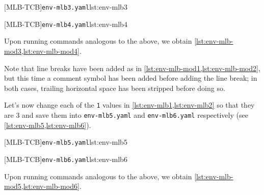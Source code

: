		\begin{minipage}{.45\textwidth}
			{\texttt{env-mlb3.yaml}}{lst:env-mlb3}
		\end{minipage}
		\hfill
		\begin{minipage}{.45\textwidth}
			{\texttt{env-mlb4.yaml}}{lst:env-mlb4}
		\end{minipage}

		Upon running commands analogous to the above, we obtain
		\cref{lst:env-mlb-mod3,lst:env-mlb-mod4}.

		\begin{widepage}
			\begin{minipage}{.56\linewidth}
			\end{minipage}
			\hfill
			\begin{minipage}{.43\linewidth}
			\end{minipage}
		\end{widepage}

		Note that line breaks have been added as in \cref{lst:env-mlb-mod1,lst:env-mlb-mod2}, but
		this time a comment symbol has been added before adding the line break; in both cases,
		trailing horizontal space has been stripped before doing so.

		Let's%
		 now change each of the \texttt{1} values in
		\cref{lst:env-mlb1,lst:env-mlb2} so that they are $3$ and save them into
		\texttt{env-mlb5.yaml} and \texttt{env-mlb6.yaml} respectively (see
		\cref{lst:env-mlb5,lst:env-mlb6}).

		\begin{minipage}{.45\textwidth}
			{\texttt{env-mlb5.yaml}}{lst:env-mlb5}
		\end{minipage}
		\hfill
		\begin{minipage}{.45\textwidth}
			{\texttt{env-mlb6.yaml}}{lst:env-mlb6}
		\end{minipage}

		Upon running commands analogous to the above, we obtain
		\cref{lst:env-mlb-mod5,lst:env-mlb-mod6}.

